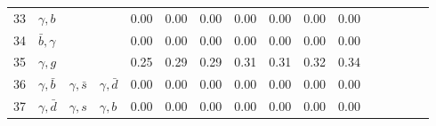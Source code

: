 \begin{tabularx}{\textwidth}{rXXX@{}S@{}S@{}S@{}S@{}S@{}S@{}S@{}S@{}S@{}S@{}S@{}S}
  33 & $\gamma, b$     &                 &                 &  0.00 &  0.00 &  0.00 &  0.00 &  0.00 &  0.00 &  0.00 \\ 
  34 & $\bar b,\gamma$ &                 &                 &  0.00 &  0.00 &  0.00 &  0.00 &  0.00 &  0.00 &  0.00 \\   
  35 & $\gamma,g$      &                 &                 &  0.25 &  0.29 &  0.29 &  0.31 &  0.31 &  0.32 &  0.34 \\
  36 & $\gamma,\bar b$ & $\gamma,\bar s$ & $\gamma,\bar d$ &  0.00 &  0.00 &  0.00 &  0.00 &  0.00 &  0.00 &  0.00 \\
  37 & $\gamma,\bar d$ & $\gamma,s$      & $\gamma,b$      &  0.00 &  0.00 &  0.00 &  0.00 &  0.00 &  0.00 &  0.00 \\  
  \bottomrule
\end{tabularx}
